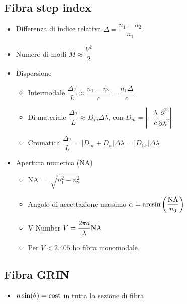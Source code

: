 \documentclass{article}
\begin{document}
\subsection{Fibra step index}
\begin{itemize}
  \item Differenza di indice relativa \(  \Delta = \dfrac{n_1 - n_2}{n_1} \)
  \item Numero di modi \(  M \approx \dfrac{V^2}{2} \)
  \item Dispersione
        \begin{itemize}
          \item Intermodale \(  \dfrac{\Delta \tau}{L} \approx \dfrac{n_1 - n_2}{c} = \dfrac{n_1 \Delta}{c} \)
          \item Di materiale \(  \dfrac{\Delta \tau}{L} \approx D_m  \Delta \lambda \), con \( D_m = \left| -\dfrac{\lambda}{c} \dfrac{\partial ^ 2}{\partial \lambda ^ 2} \right| \)
          \item Cromatica \( \dfrac{\Delta \tau}{L} = | D_m + D_w | \Delta \lambda = | D_{Cr} | \Delta \lambda \)
        \end{itemize}
  \item Apertura numerica (NA)
        \begin{itemize}
          \item NA \( \displaystyle = \sqrt{n_1^2 - n_2^2} \)
          \item Angolo di accettazione massimo \( \alpha = \arcsin \left( \dfrac{\textnormal{NA}}{n_0} \right) \)
          \item V-Number \( V = \dfrac{2 \pi a}{\lambda} \textnormal{NA} \)
          \item Per \( V < 2.405 \) ho fibra monomodale.
        \end{itemize}
\end{itemize}

\subsection{Fibra GRIN}
\begin{itemize}
  \item \( n \sin(\theta) = \textnormal{cost} \) in tutta la sezione di fibra
\end{itemize}

\newpage
\end{document}
